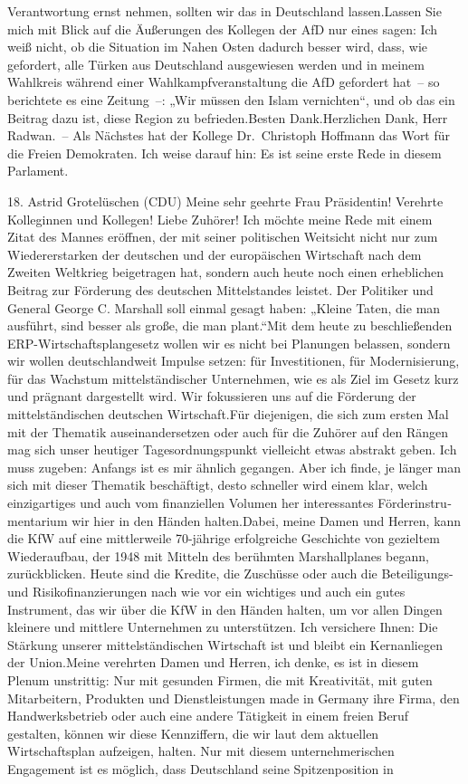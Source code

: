\documentclass{article}
\begin{document}
Verantwortung ernst nehmen, sollten wir das in Deutschland lassen.Lassen Sie mich mit Blick auf die Äußerungen des Kollegen der AfD nur eines sagen: Ich weiß nicht, ob die Situation im Nahen Osten dadurch besser wird, dass, wie gefordert, alle Türken aus Deutschland ausgewiesen werden und in meinem Wahlkreis während einer Wahlkampfveranstaltung die AfD gefordert hat – so berichtete es eine Zeitung –: „Wir müssen den Islam vernichten“, und ob das ein Beitrag dazu ist, diese Region zu befrieden.Besten Dank.Herzlichen Dank, Herr Radwan. – Als Nächstes hat der Kollege Dr. Christoph Hoffmann das Wort für die Freien Demokraten. Ich weise darauf hin: Es ist seine erste Rede in diesem Parlament.




	18. Astrid Grotelüschen (CDU) Meine sehr geehrte Frau Präsidentin! Verehrte Kolleginnen und Kollegen! Liebe Zuhörer! Ich möchte meine Rede mit einem Zitat des Mannes eröffnen, der mit seiner politischen Weitsicht nicht nur zum Wiedererstarken der deutschen und der europäischen Wirtschaft nach dem Zweiten Weltkrieg beigetragen hat, sondern auch heute noch einen erheblichen Beitrag zur Förderung des deutschen Mittelstandes leistet. Der Politiker und General George C. Marshall soll einmal gesagt haben: „Kleine Taten, die man ausführt, sind besser als große, die man plant.“Mit dem heute zu beschließenden ERP-Wirtschaftsplangesetz wollen wir es nicht bei Planungen belassen, sondern wir wollen deutschlandweit Impulse setzen: für Investitionen, für Modernisierung, für das Wachstum mittelständischer Unternehmen, wie es als Ziel im Gesetz kurz und prägnant dargestellt wird. Wir fokussieren uns auf die Förderung der mittelständischen deutschen Wirtschaft.Für diejenigen, die sich zum ersten Mal mit der Thematik auseinandersetzen oder auch für die Zuhörer auf den Rängen mag sich unser heutiger Tagesordnungspunkt vielleicht etwas abstrakt geben. Ich muss zugeben: Anfangs ist es mir ähnlich gegangen. Aber ich finde, je länger man sich mit dieser Thematik beschäftigt, desto schneller wird einem klar, welch einzigartiges und auch vom finanziellen Volumen her interessantes Förderinstru­mentarium wir hier in den Händen halten.Dabei, meine Damen und Herren, kann die KfW auf eine mittlerweile 70-jährige erfolgreiche Geschichte von gezieltem Wiederaufbau, der 1948 mit Mitteln des berühmten Marshallplanes begann, zurückblicken. Heute sind die Kredite, die Zuschüsse oder auch die Beteiligungs- und Risikofinanzierungen nach wie vor ein wichtiges und auch ein gutes Instrument, das wir über die KfW in den Händen halten, um vor allen Dingen kleinere und mittlere Unternehmen zu unterstützen. Ich versichere Ihnen: Die Stärkung unserer mittelständischen Wirtschaft ist und bleibt ein Kernanliegen der Union.Meine verehrten Damen und Herren, ich denke, es ist in diesem Plenum unstrittig: Nur mit gesunden Firmen, die mit Kreativität, mit guten Mitarbeitern, Produkten und Dienstleistungen made in Germany ihre Firma, den Handwerksbetrieb oder auch eine andere Tätigkeit in einem freien Beruf gestalten, können wir diese Kennziffern, die wir laut dem aktuellen Wirtschaftsplan aufzeigen, halten. Nur mit diesem unternehmerischen Engagement ist es möglich, dass Deutschland seine Spitzenposition in 
\end{document}
